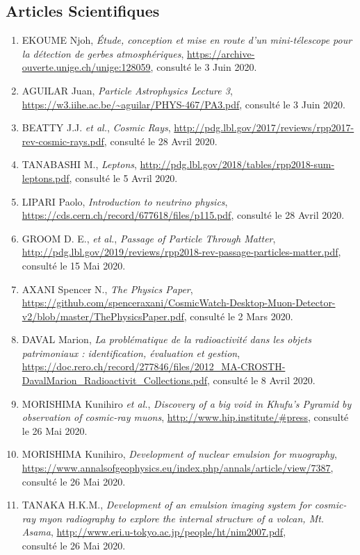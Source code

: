 \documentclass[a4paper, 12pt]{article}
\begin{document}
\begin{spacing}{1.5}
\subsection{Articles Scientifiques}

\begin{enumerate}
  \item EKOUME Njoh, \emph{Étude, conception et mise en route d’un mini-télescope pour la détection de gerbes atmosphériques}, \url{https://archive-ouverte.unige.ch/unige:128059}, consulté le 3 Juin 2020.
  \item AGUILAR Juan, \emph{Particle Astrophysics Lecture 3}, \url{https://w3.iihe.ac.be/~aguilar/PHYS-467/PA3.pdf}, consulté le 3 Juin 2020.
  \item BEATTY J.J. \emph{et al.}, \emph{Cosmic Rays}, \url{http://pdg.lbl.gov/2017/reviews/rpp2017-rev-cosmic-rays.pdf}, consulté le 28 Avril 2020.
  \item TANABASHI M., \emph{Leptons}, \url{http://pdg.lbl.gov/2018/tables/rpp2018-sum-leptons.pdf}, consulté le 5 Avril 2020.
  \item LIPARI Paolo, \emph{Introduction to neutrino physics}, \url{https://cds.cern.ch/record/677618/files/p115.pdf}, consulté le 28 Avril 2020.
  \item GROOM D. E., \emph{et al.}, \emph{Passage of Particle Through Matter}, \url{http://pdg.lbl.gov/2019/reviews/rpp2018-rev-passage-particles-matter.pdf}, consulté le 15 Mai 2020.
  \item AXANI Spencer N., \emph{The Physics Paper}, \url{https://github.com/spenceraxani/CosmicWatch-Desktop-Muon-Detector-v2/blob/master/ThePhysicsPaper.pdf}, consulté le 2 Mars 2020.
  \item DAVAL Marion, \emph{La problématique de la radioactivité dans les objets patrimoniaux : identification, évaluation et gestion}, \url{https://doc.rero.ch/record/277846/files/2012_MA-CROSTH-DavalMarion_Radioactivit_Collections.pdf}, consulté le 8 Avril 2020.
  \item MORISHIMA Kunihiro \emph{et al.}, \emph{Discovery of a big void in Khufu's Pyramid by observation of cosmic-ray muons}, \url{http://www.hip.institute/#press}, consulté le 26 Mai 2020.
  \item MORISHIMA Kunihiro, \emph{Development of nuclear emulsion for muography}, \url{https://www.annalsofgeophysics.eu/index.php/annals/article/view/7387}, consulté le 26 Mai 2020.
  \item TANAKA H.K.M., \emph{Development of an emulsion imaging system for cosmic-ray myon radiography to explore the internal structure of a volcan, Mt. Asama}, \url{http://www.eri.u-tokyo.ac.jp/people/ht/nim2007.pdf},\\consulté le 26 Mai 2020.

\end{enumerate}
\end{spacing}
\end{document}
